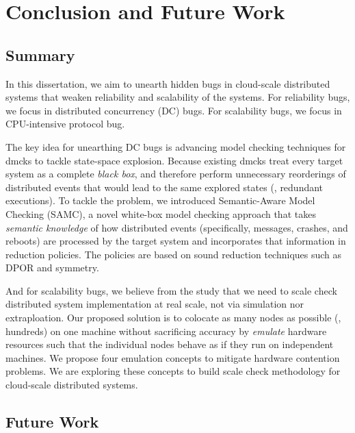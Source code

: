 \chapter{Conclusion and Future Work}
\label{chp-con}

\section{Summary}

In this dissertation, we aim to unearth hidden bugs in cloud-scale distributed
systems that weaken reliability and scalability of the systems. For reliability
bugs, we focus in distributed concurrency (DC) bugs. For scalability bugs, we
focus in CPU-intensive protocol bug.


The key idea for unearthing DC bugs is advancing model checking techniques for
dmcks to tackle state-space explosion. Because existing dmcks treat every target
system as a complete \textit{black box}, and therefore perform unnecessary
reorderings of distributed events that would lead to the same explored states
(\ie, redundant executions).  To tackle the problem, we introduced
Semantic-Aware Model Checking (SAMC), a novel white-box model checking approach
that takes \textit{semantic knowledge} of how distributed events (specifically,
messages, crashes, and reboots) are processed by the target system and
incorporates that information in reduction policies. The policies are based on
sound reduction techniques such as DPOR and symmetry.

And for scalability bugs, we believe from the study that we need to scale check
distributed system implementation at real scale, not via simulation nor
extraploation. Our proposed solution is to colocate as many nodes as possible
(\eg, hundreds) on one machine without sacrificing accuracy by {\em emulate}
hardware resources such that the individual nodes behave as if they run on
independent machines. We propose four emulation concepts to mitigate hardware
contention problems. We are exploring these concepts to build scale check
methodology for cloud-scale distributed systems.

\section{Future Work}
\label{sec-future}

